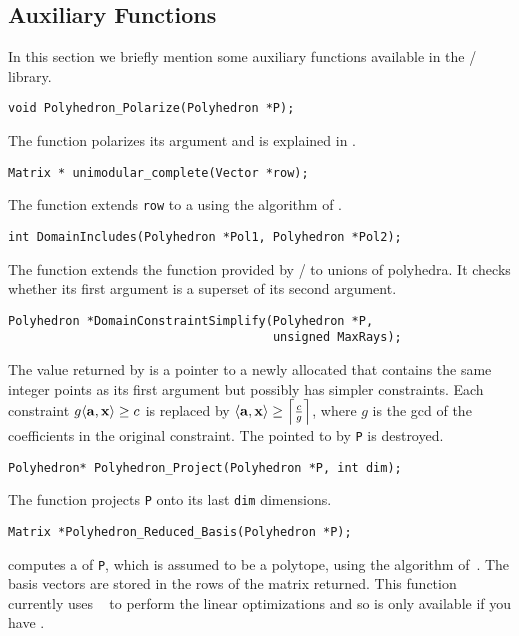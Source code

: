 \subsection{Auxiliary Functions}

In this section we briefly mention some auxiliary functions
available in the \barvinok/ library.

\begin{verbatim}
void Polyhedron_Polarize(Polyhedron *P);
\end{verbatim}
The function  
polarizes its argument and is explained
in .

\begin{verbatim}
Matrix * unimodular_complete(Vector *row);
\end{verbatim}
The function  extends
\verb+row+ to a  using the
algorithm of .

\begin{verbatim}
int DomainIncludes(Polyhedron *Pol1, Polyhedron *Pol2);
\end{verbatim}
The function  extends
the function 
provided by \PolyLib/ 
to unions of polyhedra.
It checks whether its first argument is a superset of
its second argument.

\begin{verbatim}
Polyhedron *DomainConstraintSimplify(Polyhedron *P, 
                                     unsigned MaxRays);
\end{verbatim}
The value returned by
 is a pointer to
a newly allocated  that contains the 
same integer points as its first argument but possibly
has simpler constraints.
Each constraint $ g \sp a x \ge c $
is replaced by $ \sp a x \ge \ceil{ \frac c g } $,
where $g$ is the \ac{gcd} of the coefficients in the original
constraint.
The  pointed to by \verb+P+ is destroyed.

\begin{verbatim}
Polyhedron* Polyhedron_Project(Polyhedron *P, int dim);
\end{verbatim}
The function  projects
\verb+P+ onto its last \verb+dim+ dimensions.

\begin{verbatim}
Matrix *Polyhedron_Reduced_Basis(Polyhedron *P);
\end{verbatim}
 computes
a  of {\tt P}, which
is assumed to be a polytope, using the algorithm
of~.
The basis vectors are stored in the rows of the matrix returned.
This function currently uses ~
to perform the linear optimizations and so is only available
if you have .

